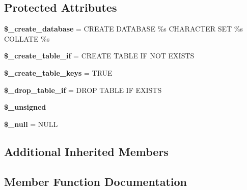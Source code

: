 \subsection*{Protected Attributes}
\begin{DoxyCompactItemize}
\item 
\mbox{\label{class_c_i___d_b__pdo__mysql__forge_a44960710c17ad5643bb9d571ba5cd3f4}} 
{\bfseries \$\+\_\+create\+\_\+database} = \textquotesingle{}C\+R\+E\+A\+TE D\+A\+T\+A\+B\+A\+SE \%s C\+H\+A\+R\+A\+C\+T\+ER S\+ET \%s C\+O\+L\+L\+A\+TE \%s\textquotesingle{}
\item 
\mbox{\label{class_c_i___d_b__pdo__mysql__forge_aaed2d409976c3e8d00fef9cc3c7a2aae}} 
{\bfseries \$\+\_\+create\+\_\+table\+\_\+if} = \textquotesingle{}C\+R\+E\+A\+TE T\+A\+B\+LE IF N\+OT E\+X\+I\+S\+TS\textquotesingle{}
\item 
\mbox{\label{class_c_i___d_b__pdo__mysql__forge_a9259bf28ffad7268fb36daa96e7a24af}} 
{\bfseries \$\+\_\+create\+\_\+table\+\_\+keys} = T\+R\+UE
\item 
\mbox{\label{class_c_i___d_b__pdo__mysql__forge_abab79707b187350b46d1960623edbc41}} 
{\bfseries \$\+\_\+drop\+\_\+table\+\_\+if} = \textquotesingle{}D\+R\+OP T\+A\+B\+LE IF E\+X\+I\+S\+TS\textquotesingle{}
\item 
{\bfseries \$\+\_\+unsigned}
\item 
\mbox{\label{class_c_i___d_b__pdo__mysql__forge_ad457e92bbb120327750bc3f4fae31c7a}} 
{\bfseries \$\+\_\+null} = \textquotesingle{}N\+U\+LL\textquotesingle{}
\end{DoxyCompactItemize}
\subsection*{Additional Inherited Members}


\subsection{Member Function Documentation}
\mbox{\label{class_c_i___d_b__pdo__mysql__forge_ad94713741032d7385563501107e398bd}} 
